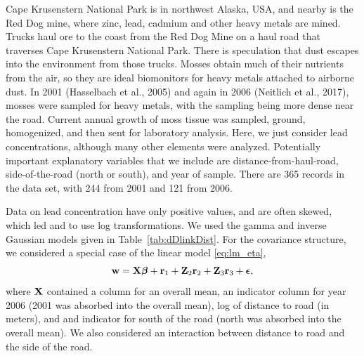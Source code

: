 \documentclass[12pt, titlepage]{article}
\begin{document}
Cape Krusenstern National Park is in northwest Alaska, USA, and nearby is the Red Dog mine, where zinc, lead, cadmium and other heavy metals are mined. Trucks haul ore to the coast from the Red Dog Mine on a haul road that traverses Cape Krusenstern National Park. There is speculation that dust escapes into the environment from those trucks. Mosses obtain much of their nutrients from the air, so they are ideal biomonitors for heavy metals attached to airborne dust. In 2001 (Hasselbach et al., 2005) and again in 2006 (Neitlich et al., 2017), mosses were sampled for heavy metals, with the sampling being more dense near the road. Current annual growth of moss tissue was sampled, ground, homogenized, and then sent for laboratory analysis. Here, we just consider lead concentrations, although many other elements were analyzed. Potentially important explanatory variables that we include are distance-from-haul-road, side-of-the-road (north or south), and year of sample.  There are 365 records in the data set, with 244 from 2001 and 121 from 2006. 

Data on lead concentration have only positive values, and are often skewed, which led \citet{hasselbach_spatial_2005} and \citet{neitlich_trends_2017} to use log transformations. We used the gamma and inverse Gaussian models given in Table~\ref{tab:dDlinkDist}.  For the covariance structure, we considered a special case of the linear model \eqref{eq:lm_eta},
$$
\mathbf{w} = \mathbf{X}\boldsymbol{\beta} + \mathbf{r}_{1} + \mathbf{Z}_{2}\mathbf{r}_{2} + \mathbf{Z}_{3}\mathbf{r}_{3} + \mbox{\boldmath $\epsilon$},
$$
where $\mathbf{X}$ contained a column for an overall mean, an indicator column for year 2006 (2001 was absorbed into the overall mean), log of distance to road (in meters), and and indicator for south of the road (north was absorbed into the overall mean).  We also considered an interaction between distance to road and the side of the road.
\end{document}
